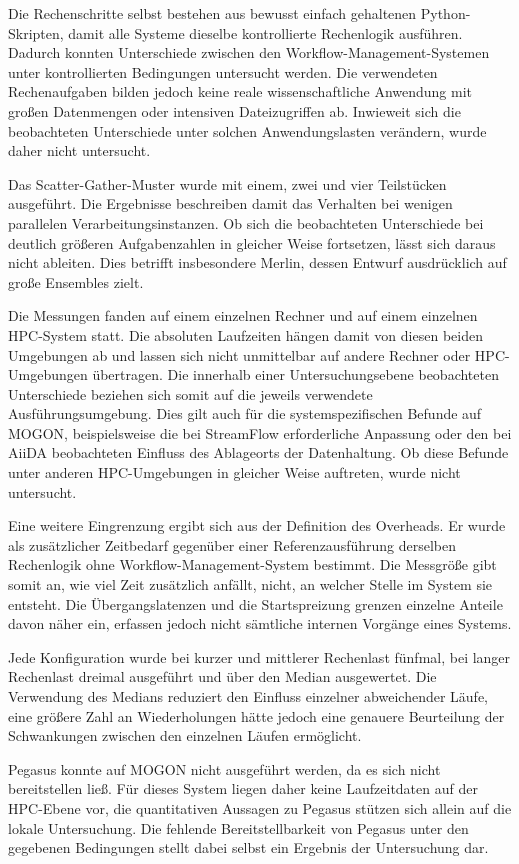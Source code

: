 Die Rechenschritte selbst bestehen aus bewusst einfach gehaltenen
Python-Skripten, damit alle Systeme dieselbe kontrollierte
Rechenlogik ausführen. Dadurch konnten Unterschiede zwischen den
Workflow-Management-Systemen unter kontrollierten Bedingungen
untersucht werden. Die verwendeten Rechenaufgaben bilden jedoch
keine reale wissenschaftliche Anwendung mit großen Datenmengen oder
intensiven Dateizugriffen ab. Inwieweit sich die beobachteten
Unterschiede unter solchen Anwendungslasten verändern, wurde daher
nicht untersucht.

Das Scatter-Gather-Muster wurde mit einem, zwei und vier
Teilstücken ausgeführt. Die Ergebnisse beschreiben damit das
Verhalten bei wenigen parallelen Verarbeitungsinstanzen. Ob sich
die beobachteten Unterschiede bei deutlich größeren Aufgabenzahlen
in gleicher Weise fortsetzen, lässt sich daraus nicht ableiten.
Dies betrifft insbesondere Merlin, dessen Entwurf ausdrücklich auf
große Ensembles zielt.

Die Messungen fanden auf einem einzelnen Rechner und auf einem
einzelnen HPC-System statt. Die absoluten Laufzeiten hängen damit
von diesen beiden Umgebungen ab und lassen sich nicht unmittelbar auf andere
Rechner oder HPC-Umgebungen übertragen.
Die innerhalb einer Untersuchungsebene beobachteten Unterschiede 
beziehen sich somit auf die jeweils verwendete Ausführungsumgebung.
Dies gilt auch für die systemspezifischen Befunde auf MOGON, 
beispielsweise die bei StreamFlow erforderliche Anpassung oder den bei AiiDA beobachteten Einfluss des Ablageorts der Datenhaltung. Ob diese Befunde unter
anderen HPC-Umgebungen in gleicher Weise auftreten, wurde nicht
untersucht.

Eine weitere Eingrenzung ergibt sich aus der Definition des
Overheads. Er wurde als zusätzlicher Zeitbedarf gegenüber einer
Referenzausführung derselben Rechenlogik ohne
Workflow-Management-System bestimmt. Die Messgröße gibt somit an,
wie viel Zeit zusätzlich anfällt, nicht, an welcher Stelle im
System sie entsteht. Die Übergangslatenzen und die Startspreizung
grenzen einzelne Anteile davon näher ein, erfassen jedoch nicht sämtliche internen Vorgänge eines Systems.

Jede Konfiguration wurde bei kurzer und mittlerer Rechenlast
fünfmal, bei langer Rechenlast dreimal ausgeführt und über den
Median ausgewertet. Die Verwendung des Medians reduziert den Einfluss einzelner abweichender Läufe, eine größere Zahl an Wiederholungen hätte jedoch eine genauere Beurteilung der Schwankungen zwischen den einzelnen Läufen ermöglicht.

Pegasus konnte auf MOGON nicht ausgeführt werden, da es sich
nicht bereitstellen ließ. Für dieses System liegen daher keine
Laufzeitdaten auf der HPC-Ebene vor, die quantitativen Aussagen zu
Pegasus stützen sich allein auf die lokale Untersuchung. Die
fehlende Bereitstellbarkeit von Pegasus unter den gegebenen
Bedingungen stellt dabei selbst ein Ergebnis der Untersuchung dar.